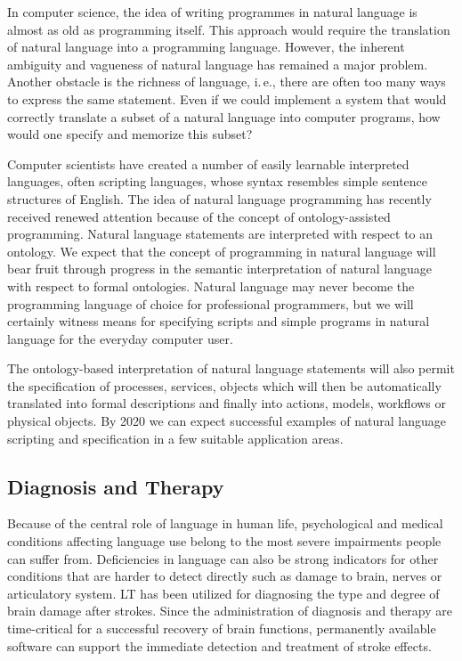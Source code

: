 \documentclass[10pt, plain]{../../metanetpaper}
\begin{document}
\begin{multicols}{2}
In computer science, the idea of writing programmes in natural language is almost as old as programming itself. This approach would require the translation of natural language into a programming language. However, the inherent ambiguity and vagueness of natural language has remained a major problem. Another obstacle is the richness of language, i.\,e., there are often too many ways to express the same statement. Even if we could implement a system that would correctly translate a subset of a natural language into computer programs, how would one specify and memorize this subset?
 
Computer scientists have created a number of easily learnable interpreted languages, often scripting languages, whose syntax resembles simple sentence structures of English. The idea of natural language programming has recently received renewed attention because of the concept of ontology-assisted programming. Natural language statements are interpreted with respect to an ontology. We expect that the concept of programming in natural language will bear fruit through progress in the semantic interpretation of natural language with respect to formal ontologies. Natural language may never become the programming language of choice for professional programmers, but we will certainly witness means for specifying scripts and simple programs in natural language for the everyday computer user.
 
The ontology-based interpretation of natural language statements will also permit the specification of processes, services, objects which will then be automatically translated into formal descriptions and finally into actions, models, workflows or physical objects. By 2020 we can expect successful examples of natural language scripting and specification in a few suitable application areas.

\subsection{Diagnosis and Therapy}
\label{sec:diagnosis-therapy}

Because of the central role of language in human life, psychological and medical conditions affecting language use belong to the most severe impairments people can suffer from. Deficiencies in language can also be strong indicators for other conditions that are harder to detect directly such as damage to brain, nerves or articulatory system. LT has been utilized for diagnosing the type and degree of brain damage after strokes. Since the administration of diagnosis and therapy are time-critical for a successful recovery of brain functions, permanently available software can support the immediate detection and treatment of stroke effects.
 

\end{multicols}
\end{document}
